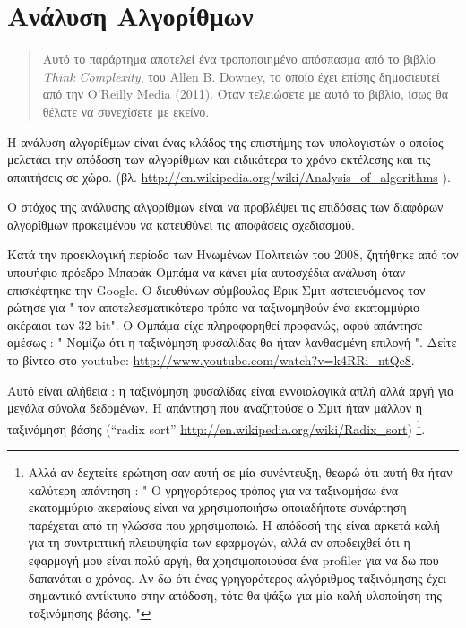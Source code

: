 \documentclass[10pt]{book}
\begin{document}
\chapter{Ανάλυση Αλγορίθμων}

\begin{quote}
Αυτό το παράρτημα αποτελεί ένα τροποποιημένο απόσπασμα από το βιβλίο  {\it Think Complexity},  του  Allen B. Downey,  το οποίο έχει επίσης δημοσιευτεί από 
την  O'Reilly Media (2011).   Όταν τελειώσετε με αυτό το βιβλίο, ίσως θα θέλατε να συνεχίσετε με εκείνο.
\end{quote}

Η ανάλυση αλγορίθμων είναι ένας κλάδος της επιστήμης των υπολογιστών ο οποίος μελετάει την απόδοση των αλγορίθμων και ειδικότερα το χρόνο εκτέλεσης και τις απαιτήσεις σε χώρο. (βλ. \url{http://en.wikipedia.org/wiki/Analysis_of_algorithms} ). 
 

Ο στόχος της ανάλυσης αλγορίθμων είναι να προβλέψει τις επιδόσεις των διαφόρων 
αλγορίθμων προκειμένου να κατευθύνει τις αποφάσεις σχεδιασμού.

Κατά την προεκλογική περίοδο των Ηνωμένων Πολιτειών του 2008, ζητήθηκε από τον  υποψήφιο πρόεδρο Μπαράκ Ομπάμα να κάνει μία αυτοσχέδια ανάλυση όταν επισκέφτηκε την  Google.   Ο διευθύνων σύμβουλος Έρικ Σμιτ αστειευόμενος τον ρώτησε για  " τον αποτελεσματικότερο τρόπο να ταξινομηθούν ένα εκατομμύριο ακέραιοι των  32-bit".   Ο Ομπάμα είχε πληροφορηθεί προφανώς, αφού απάντησε αμέσως  : " Νομίζω ότι η ταξινόμηση φυσαλίδας θα ήταν λανθασμένη επιλογή ".   Δείτε το βίντεο στο  youtube: \url{http://www.youtube.com/watch?v=k4RRi_ntQc8}.

 Αυτό είναι αλήθεια :  η ταξινόμηση φυσαλίδας είναι εννοιολογικά απλή αλλά 
αργή για μεγάλα σύνολα δεδομένων.  Η απάντηση που αναζητούσε ο Σμιτ ήταν μάλλον η ταξινόμηση βάσης  (``radix sort'' \url{http://en.wikipedia.org/wiki/Radix_sort})
 \footnote{
Αλλά αν δεχτείτε ερώτηση σαν αυτή σε μία συνέντευξη, θεωρώ ότι αυτή θα ήταν καλύτερη απάντηση : " Ο γρηγορότερος τρόπος για να ταξινομήσω ένα εκατομμύριο ακεραίους είναι να χρησιμοποιήσω οποιαδήποτε συνάρτηση παρέχεται από τη γλώσσα που χρησιμοποιώ.  Η απόδοσή της είναι αρκετά καλή για τη συντριπτική πλειοψηφία των εφαρμογών, αλλά αν αποδειχθεί ότι η εφαρμογή μου είναι πολύ αργή, θα χρησιμοποιούσα ένα  profiler  για να δω που δαπανάται ο χρόνος.  Αν δω ότι ένας γρηγορότερος αλγόριθμος ταξινόμησης έχει σημαντικό αντίκτυπο στην απόδοση, τότε θα ψάξω για μία καλή υλοποίηση της ταξινόμησης βάσης. " }.
\end{document}
